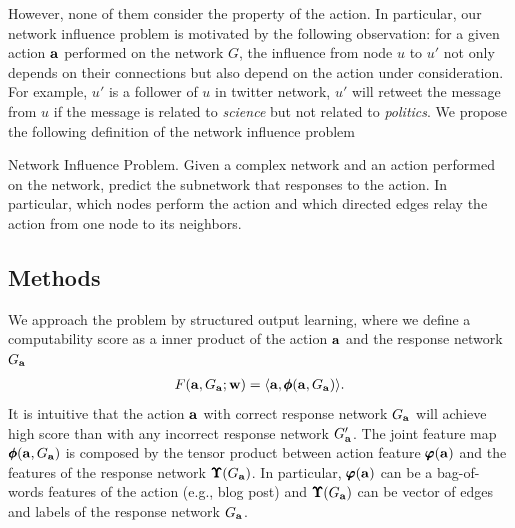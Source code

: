 {However, none of them consider the property of the action.
In particular, our network influence problem is motivated by the following observation: for a given action $\mathbf {a}$ performed on the network $G$, the influence from node $u$ to $u'$ not only depends on their connections but also depend on the action under consideration.
For example, $u'$ is a follower of $u$ in twitter network, $u'$ will retweet the message from $u$ if the message is related to \textit{science} but not related to \textit{politics}.
We propose the following definition of the network influence problem
\begin{definition}{Network Influence Problem.}
	Given a complex network and an action performed on the network, predict the subnetwork that responses to the action. In particular, which nodes perform the action and which directed edges relay the action from one node to its neighbors.
\end{definition}

%
\subsection{Methods}
We approach the problem by structured output learning, where we define a computability score as a inner product of the action $\mathbf {a}$ and the response network $G_{\mathbf {a}}$
\begin{align*}
	F(\mathbf {a},G_{\mathbf {a}};\mathbf {w}) = \langle \mathbf {a}, \pmb \phi(\mathbf {a},G_{\mathbf {a}}) \rangle.
\end{align*}
It is intuitive that the action $\mathbf {a}$ with correct response network $G_{\mathbf {a}}$ will achieve high score than with any incorrect response network $G_{\mathbf {a}}'$.
The joint feature map $\pmb \phi(\mathbf {a},G_{\mathbf {a}})$ is composed by the tensor product between action feature $\pmb \varphi(\mathbf {a})$ and the features of the response network $\pmb \Upsilon(G_{\mathbf {a}})$.
In particular, $\pmb \varphi(\mathbf {a})$ can be a bag-of-words features of the action (e.g., blog post) and $\pmb \Upsilon(G_{\mathbf {a}})$ can be vector of edges and labels of the response network $G_{\mathbf {a}}$.

}
